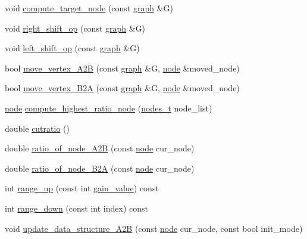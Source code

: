\begin{DoxyCompactItemize}
void \mbox{\hyperlink{classratio__cut__partition_ae9a09532c706835e47ee4f02c24c82af}{compute\+\_\+target\+\_\+node}} (const \mbox{\hyperlink{classgraph}{graph}} \&G)
\item 
void \mbox{\hyperlink{classratio__cut__partition_a9b2ac474cfdeabd8a2c5cb42fcc97d26}{right\+\_\+shift\+\_\+op}} (const \mbox{\hyperlink{classgraph}{graph}} \&G)
\item 
void \mbox{\hyperlink{classratio__cut__partition_af736bd4e468935c1b1642f78d3df665d}{left\+\_\+shift\+\_\+op}} (const \mbox{\hyperlink{classgraph}{graph}} \&G)
\item 
bool \mbox{\hyperlink{classratio__cut__partition_a8988d72cd456e79243f0e1c1b03ed501}{move\+\_\+vertex\+\_\+\+A2B}} (const \mbox{\hyperlink{classgraph}{graph}} \&G, \mbox{\hyperlink{classnode}{node}} \&moved\+\_\+node)
\item 
bool \mbox{\hyperlink{classratio__cut__partition_ab192d7130a80b6acf7da704162c51e6c}{move\+\_\+vertex\+\_\+\+B2A}} (const \mbox{\hyperlink{classgraph}{graph}} \&G, \mbox{\hyperlink{classnode}{node}} \&moved\+\_\+node)
\item 
\mbox{\hyperlink{classnode}{node}} \mbox{\hyperlink{classratio__cut__partition_a11bd0644238997c99e7035507c709e50}{compute\+\_\+highest\+\_\+ratio\+\_\+node}} (\mbox{\hyperlink{edge_8h_a22ac17689106ba21a84e7bc54d1199d6}{nodes\+\_\+t}} node\+\_\+list)
\item 
double \mbox{\hyperlink{classratio__cut__partition_a0adcba3c7847fcb62b607eebc334c503}{cutratio}} ()
\item 
double \mbox{\hyperlink{classratio__cut__partition_add7d355bd4df2cf6fa77ddc791692c88}{ratio\+\_\+of\+\_\+node\+\_\+\+A2B}} (const \mbox{\hyperlink{classnode}{node}} cur\+\_\+node)
\item 
double \mbox{\hyperlink{classratio__cut__partition_a094de379f453978db56695d53f6bc536}{ratio\+\_\+of\+\_\+node\+\_\+\+B2A}} (const \mbox{\hyperlink{classnode}{node}} cur\+\_\+node)
\item 
int \mbox{\hyperlink{classratio__cut__partition_a5cda26b908793b59881798d88b07344c}{range\+\_\+up}} (const int \mbox{\hyperlink{classratio__cut__partition_af24ff191abbb0578f0bfc54fef5f6d45}{gain\+\_\+value}}) const
\item 
int \mbox{\hyperlink{classratio__cut__partition_a3933d3829218a58cfc8eef84981034a8}{range\+\_\+down}} (const int index) const
\item 
void \mbox{\hyperlink{classratio__cut__partition_acdb4b69b6c94f06f6997ccec296a281f}{update\+\_\+data\+\_\+structure\+\_\+\+A2B}} (const \mbox{\hyperlink{classnode}{node}} cur\+\_\+node, const bool init\+\_\+mode)

\end{DoxyCompactItemize}
